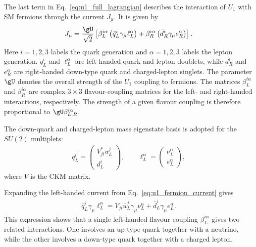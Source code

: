 The last term in Eq.~\eqref{eq:u1_full_lagrangian} describes the interaction of $U_{1}$ with SM fermions through the current $J_{\mu}$. It is given by
\begin{align}
    J_{\mu}
    =
    \frac{\gU}{\sqrt{2}}
    \left[
        \beta_{L}^{i\alpha}
        \left(
            \bar{q}_{L}^{i}
            \gamma_{\mu}
            \ell_{L}^{\alpha}
        \right)
        +
        \beta_{R}^{i\alpha}
        \left(
            \bar{d}_{R}^{i}
            \gamma_{\mu}
            e_{R}^{\alpha}
        \right)
    \right].
    \label{eq:u1_fermion_current}
\end{align}
Here $i=1,2,3$ labels the quark generation and $\alpha=1,2,3$ labels the lepton generation. $q_{L}^{i}$ and $\ell_{L}^{\alpha}$ are left-handed quark and lepton doublets, while $d_{R}^{i}$ and $e_{R}^{\alpha}$ are right-handed down-type quark and charged-lepton singlets. 
The parameter $\gU$ denotes the overall strength of the $U_{1}$ coupling to fermions. 
The matrices $\beta_{L}^{i\alpha}$ and $\beta_{R}^{i\alpha}$ are complex $3\times3$ flavour-coupling matrices for the left- and right-handed interactions, respectively. 
The strength of a given flavour coupling is therefore proportional to $\gU\beta_{L,R}^{i\alpha}$.

The down-quark and charged-lepton mass eigenstate basis is adopted for the $SU(2)$ multiplets:
\begin{align}
    q_{L}^{i}
    =
    \begin{pmatrix}
        V_{ji}^{*}u_{L}^{j}\\
        d_{L}^{i}
    \end{pmatrix},
    \qquad
    \ell_{L}^{\alpha}
    =
    \begin{pmatrix}
        \nu_{L}^{\alpha}\\
        e_{L}^{\alpha}
    \end{pmatrix},
    \label{eq:u1_flavour_basis}
\end{align}
where $V$ is the CKM matrix. 

Expanding the left-handed current from Eq.~\ref{eq:u1_fermion_current} gives
\begin{align}
    \bar{q}_{L}^{i}
    \gamma_{\mu}
    \ell_{L}^{\alpha}
    =
    V_{ji}
    \bar{u}_{L}^{j}
    \gamma_{\mu}
    \nu_{L}^{\alpha}
    +
    \bar{d}_{L}^{i}
    \gamma_{\mu}
    e_{L}^{\alpha}.
    \label{eq:u1_current_expanded}
\end{align}
This expression shows that a single left-handed flavour coupling $\beta_{L}^{i\alpha}$ gives two related interactions. 
One involves an up-type quark together with a neutrino, while the other involves a down-type quark together with a charged lepton.

